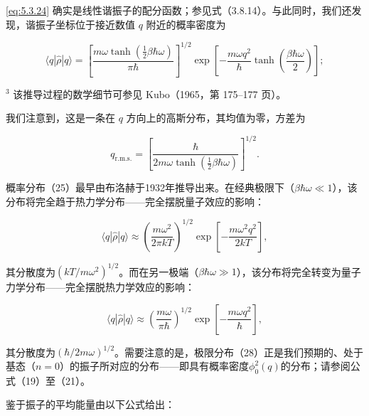\autoref{eq:5.3.24} 确实是线性谐振子的配分函数；参见式（3.8.14）。与此同时，我们还发现，谐振子坐标位于接近数值 \(q\) 附近的概率密度为

\begin{equation}\tag{5.3.25}\label{eq:5.3.25}
\langle q | \hat { \rho } | q \rangle = \left[ \frac { m \omega \operatorname { t a n h } \left( \frac { 1 } { 2 } \beta \hbar \omega \right) } { \pi \hbar } \right] ^{1 / 2} \exp \left[ - \frac { m \omega q ^{2} } { \hbar } \operatorname { t a n h } \left( \frac { \beta \hbar \omega } { 2 } \right) \right] ;
\end{equation}

\(^{3}\) 该推导过程的数学细节可参见 Kubo（1965，第 175--177 页）。

我们注意到，这是一条在 \(q\) 方向上的高斯分布，其均值为零，方差为

\begin{equation}\tag{5.3.26}\label{eq:5.3.26}
q _ { \mathrm { r . m . s . } } = \left[ \frac { \hbar } { 2 m \omega \operatorname { t a n h } \left( \frac { 1 } { 2 } \beta \hbar \omega \right) } \right] ^{1 / 2} .
\end{equation}

概率分布（25）最早由布洛赫于1932年推导出来。在经典极限下（\(\beta\hbar\omega\ll1\)），该分布将完全趋于热力学分布------完全摆脱量子效应的影响：

\begin{equation}\tag{5.3.27}\label{eq:5.3.27}
\langle q | \hat { \rho } | q \rangle \approx \left( \frac { m \omega ^{2} } { 2 \pi k T } \right) ^{1 / 2} \exp \left[ - \frac { m \omega ^{2} q ^{2} } { 2 k T } \right] ,
\end{equation}

其分散度为\((kT/m\omega^2)^{1/2}\)。而在另一极端（\(\beta\hbar\omega\gg1\)），该分布将完全转变为量子力学分布------完全摆脱热力学效应的影响：

\begin{equation}\tag{5.3.28}\label{eq:5.3.28}
\langle q | \hat { \rho } | q \rangle \approx \left( \frac { m \omega } { \pi \hbar } \right) ^{1 / 2} \exp \left[ - \frac { m \omega q ^{2} } { \hbar } \right] ,
\end{equation}

其分散度为\((\hbar/2m\omega)^{1/2}\)。需要注意的是，极限分布（28）正是我们预期的、处于基态（\(n=0\)）的振子所对应的分布------即具有概率密度\(\phi_{0}^{2}(q)\)的分布；请参阅公式（19）至（21）。

鉴于振子的平均能量由以下公式给出：

